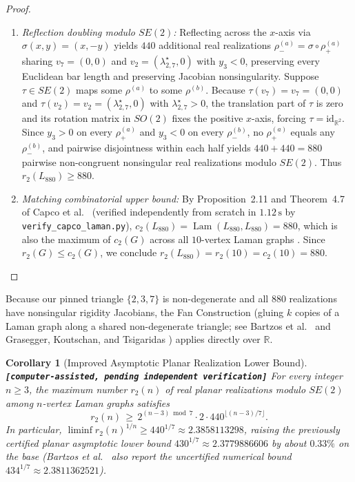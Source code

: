 \documentclass[11pt,a4paper]{article}
\newtheorem{corollary}[theorem]{Corollary}
\theoremstyle{definition}
\theoremstyle{remark}
\newcommand{\claimtag}[1]{\textup{\textbf{\texttt{[#1]}}}}
\begin{document}
\begin{proof}
\begin{enumerate}
\item \emph{Reflection doubling modulo $SE(2)$:} Reflecting across the $x$-axis via $\sigma(x,y) = (x,-y)$ yields $440$ additional real realizations $\rho_-^{(a)} = \sigma \circ \rho_+^{(a)}$ sharing $v_7 = (0,0)$ and $v_2 = (\lambda_{2,7}^\star, 0)$ with $y_3 < 0$, preserving every Euclidean bar length and preserving Jacobian nonsingularity. Suppose $\tau \in SE(2)$ maps some $\rho^{(a)}$ to some $\rho^{(b)}$. Because $\tau(v_7) = v_7 = (0,0)$ and $\tau(v_2) = v_2 = (\lambda_{2,7}^\star, 0)$ with $\lambda_{2,7}^\star > 0$, the translation part of $\tau$ is zero and its rotation matrix in $SO(2)$ fixes the positive $x$-axis, forcing $\tau = \mathrm{id}_{\mathbb{R}^2}$. Since $y_3 > 0$ on every $\rho_+^{(a)}$ and $y_3 < 0$ on every $\rho_-^{(b)}$, no $\rho_+^{(a)}$ equals any $\rho_-^{(b)}$, and pairwise disjointness within each half yields $440 + 440 = 880$ pairwise non-congruent nonsingular real realizations modulo $SE(2)$. Thus $r_2(L_{880}) \ge 880$.
\item \emph{Matching combinatorial upper bound:} By Proposition~2.11 and Theorem~4.7 of Capco et al.\ \cite{CGGKLS18} (verified independently from scratch in $1.12\,\text{s}$ by \texttt{verify\_capco\_laman.py}), $c_2(L_{880}) = \operatorname{Lam}(L_{880}, L_{880}) = 880$, which is also the maximum of $c_2(G)$ across all $10$-vertex Laman graphs \cite[Table~2]{CGGKLS18}. Since $r_2(G) \le c_2(G)$, we conclude $r_2(L_{880}) = r_2(10) = c_2(10) = 880$.
\end{enumerate}
\end{proof}

Because our pinned triangle $\{2,3,7\}$ is non-degenerate and all $880$ realizations have nonsingular rigidity Jacobians, the Fan Construction (gluing $k$ copies of a Laman graph along a shared non-degenerate triangle; see Bartzos et al.\ \cite[Theorem~3]{BELT18} and Grasegger, Koutschan, and Tsigaridas \cite[Section~3.2, Formula~(2)]{GKT20}) applies directly over $\mathbb{R}$.

\begin{corollary}[Improved Asymptotic Planar Realization Lower Bound]
\label{cor:fan}
\claimtag{computer-assisted, pending independent verification} For every integer $n \ge 3$, the maximum number $r_2(n)$ of real planar realizations modulo $SE(2)$ among $n$-vertex Laman graphs satisfies
\begin{equation}\label{eq:fanbound}
r_2(n) \,\ge\, 2^{(n-3)\bmod 7} \cdot 2 \cdot 440^{\lfloor (n-3)/7 \rfloor}.
\end{equation}
In particular, $\liminf r_2(n)^{1/n} \ge 440^{1/7} \approx 2.3858113298$, raising the previously certified planar asymptotic lower bound $430^{1/7} \approx 2.3779886606$ by about $0.33\%$ on the base (Bartzos et al.\ \cite{BELT18} also report the uncertified numerical bound $434^{1/7} \approx 2.3811362521$).
\end{corollary}
\end{document}

